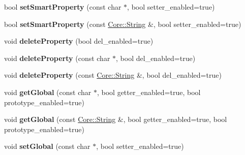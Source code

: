\begin{DoxyCompactItemize}
\item 
bool {\bfseries set\+Smart\+Property} (const char $\ast$, bool setter\+\_\+enabled=true)\hypertarget{class_object_script_1_1_o_s_a228989208916cda2cd205e55ac4b556c}{}\label{class_object_script_1_1_o_s_a228989208916cda2cd205e55ac4b556c}

\item 
bool {\bfseries set\+Smart\+Property} (const \hyperlink{class_object_script_1_1_o_s_1_1_core_1_1_string}{Core\+::\+String} \&, bool setter\+\_\+enabled=true)\hypertarget{class_object_script_1_1_o_s_a2d2c8920eb3bb4666c23b7452f7ab0ee}{}\label{class_object_script_1_1_o_s_a2d2c8920eb3bb4666c23b7452f7ab0ee}

\item 
void {\bfseries delete\+Property} (bool del\+\_\+enabled=true)\hypertarget{class_object_script_1_1_o_s_ab0abb9341eb99aac16e3b9981c323a74}{}\label{class_object_script_1_1_o_s_ab0abb9341eb99aac16e3b9981c323a74}

\item 
void {\bfseries delete\+Property} (const char $\ast$, bool del\+\_\+enabled=true)\hypertarget{class_object_script_1_1_o_s_a6dad203d51ba1c86bf1ea4a9688cb37a}{}\label{class_object_script_1_1_o_s_a6dad203d51ba1c86bf1ea4a9688cb37a}

\item 
void {\bfseries delete\+Property} (const \hyperlink{class_object_script_1_1_o_s_1_1_core_1_1_string}{Core\+::\+String} \&, bool del\+\_\+enabled=true)\hypertarget{class_object_script_1_1_o_s_a92c888b9470c2096bbcef5fa77777c0d}{}\label{class_object_script_1_1_o_s_a92c888b9470c2096bbcef5fa77777c0d}

\item 
void {\bfseries get\+Global} (const char $\ast$, bool getter\+\_\+enabled=true, bool prototype\+\_\+enabled=true)\hypertarget{class_object_script_1_1_o_s_a7d847a120259b5db8fef9f11f73f6633}{}\label{class_object_script_1_1_o_s_a7d847a120259b5db8fef9f11f73f6633}

\item 
void {\bfseries get\+Global} (const \hyperlink{class_object_script_1_1_o_s_1_1_core_1_1_string}{Core\+::\+String} \&, bool getter\+\_\+enabled=true, bool prototype\+\_\+enabled=true)\hypertarget{class_object_script_1_1_o_s_a5f42f2d99e789eb7f5464f1f7c4e9dd5}{}\label{class_object_script_1_1_o_s_a5f42f2d99e789eb7f5464f1f7c4e9dd5}

\item 
void {\bfseries set\+Global} (const char $\ast$, bool setter\+\_\+enabled=true)\hypertarget{class_object_script_1_1_o_s_a78aa5613fe989d0f99949f733e861524}{}\label{class_object_script_1_1_o_s_a78aa5613fe989d0f99949f733e861524}


\end{DoxyCompactItemize}
